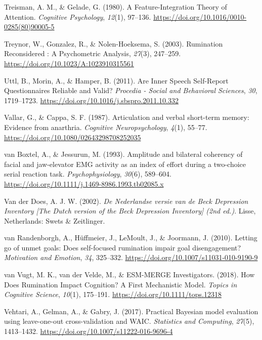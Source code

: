 \documentclass[a4paper,12pt,twoside,openright,oldfontcommands]{memoir}
\begin{document}
\leavevmode\hypertarget{ref-treisman_feature-integration_1980}{}%
Treisman, A. M., \& Gelade, G. (1980). A Feature-Integration Theory of Attention. \emph{Cognitive Psychology}, \emph{12}(1), 97--136. \url{https://doi.org/10.1016/0010-0285(80)90005-5}

\leavevmode\hypertarget{ref-treynor_rumination_2003}{}%
Treynor, W., Gonzalez, R., \& Nolen-Hoeksema, S. (2003). Rumination Reconsidered : A Psychometric Analysis, \emph{27}(3), 247--259. \url{https://doi.org/10.1023/A:1023910315561}

\leavevmode\hypertarget{ref-Uttl2011}{}%
Uttl, B., Morin, A., \& Hamper, B. (2011). Are Inner Speech Self-Report Questionnaires Reliable and Valid? \emph{Procedia - Social and Behavioral Sciences}, \emph{30}, 1719--1723. \url{https://doi.org/10.1016/j.sbspro.2011.10.332}

\leavevmode\hypertarget{ref-vallar_articulation_1987}{}%
Vallar, G., \& Cappa, S. F. (1987). Articulation and verbal short-term memory: Evidence from anarthria. \emph{Cognitive Neuropsychology}, \emph{4}(1), 55--77. \url{https://doi.org/10.1080/02643298708252035}

\leavevmode\hypertarget{ref-van_boxtel_amplitude_1993}{}%
van Boxtel, A., \& Jessurun, M. (1993). Amplitude and bilateral coherency of facial and jaw-elevator EMG activity as an index of effort during a two-choice serial reaction task. \emph{Psychophysiology}, \emph{30}(6), 589--604. \url{https://doi.org/10.1111/j.1469-8986.1993.tb02085.x}

\leavevmode\hypertarget{ref-van_der_does_nederlandse_2002}{}%
Van der Does, A. J. W. (2002). \emph{De Nederlandse versie van de Beck Depression Inventory {[}The Dutch version of the Beck Depression Inventory{]} (2nd ed.)}. Lisse, Netherlands: Swets \& Zeitlinger.

\leavevmode\hypertarget{ref-VanRandenborgh2010}{}%
van Randenborgh, A., Hüffmeier, J., LeMoult, J., \& Joormann, J. (2010). Letting go of unmet goals: Does self-focused rumination impair goal disengagement? \emph{Motivation and Emotion}, \emph{34}, 325--332. \url{https://doi.org/10.1007/s11031-010-9190-9}

\leavevmode\hypertarget{ref-van_vugt_how_2018}{}%
van Vugt, M. K., van der Velde, M., \& ESM-MERGE Investigators. (2018). How Does Rumination Impact Cognition? A First Mechanistic Model. \emph{Topics in Cognitive Science}, \emph{10}(1), 175--191. \url{https://doi.org/10.1111/tops.12318}

\leavevmode\hypertarget{ref-vehtari_practical_2017}{}%
Vehtari, A., Gelman, A., \& Gabry, J. (2017). Practical Bayesian model evaluation using leave-one-out cross-validation and WAIC. \emph{Statistics and Computing}, \emph{27}(5), 1413--1432. \url{https://doi.org/10.1007/s11222-016-9696-4}
\end{document}
